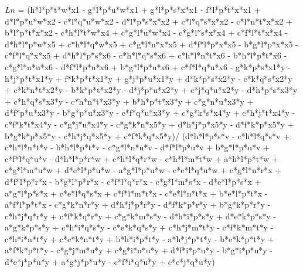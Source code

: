 \documentclass[10pt]{article} %
\begin{document}
$\dot{Ln}$ =
{\tiny
    (h*l*p*t*w*x1 - g*l*p*u*w*x1 + g*l*p*s*x*x1 - f*l*p*t*x*x1 +
     d*l*p*u*w*x2 - c*l*q*u*w*x2 - d*l*p*s*x*x2 + c*l*q*s*x*x2 -
     c*l*n*t*x*x2 + b*l*p*t*x*x2 - c*h*l*t*w*x4 + c*g*l*u*w*x4 -
     c*g*l*s*x*x4 + c*f*l*t*x*x4 - d*h*l*p*w*x5 + c*h*l*q*w*x5 +
     c*g*l*n*x*x5 + d*f*l*p*x*x5 - b*g*l*p*x*x5 - c*f*l*q*x*x5 +
     d*h*l*p*s*x6 - c*h*l*q*s*x6 + c*h*l*n*t*x6 - b*h*l*p*t*x6 -
     c*g*l*n*u*x6 - d*f*l*p*u*x6 + b*g*l*p*u*x6 + c*f*l*q*u*x6 -
     g*k*p*s*x1*y - h*j*p*t*x1*y + f*k*p*t*x1*y + g*j*p*u*x1*y +
     d*k*p*s*x2*y - c*k*q*s*x2*y + c*k*n*t*x2*y - b*k*p*t*x2*y -
     d*j*p*u*x2*y + c*j*q*u*x2*y - d*h*p*s*x3*y + c*h*q*s*x3*y -
     c*h*n*t*x3*y + b*h*p*t*x3*y + c*g*n*u*x3*y + d*f*p*u*x3*y -
     b*g*p*u*x3*y - c*f*q*u*x3*y + c*g*k*s*x4*y + c*h*j*t*x4*y -
     c*f*k*t*x4*y - c*g*j*u*x4*y - c*g*k*n*x5*y + d*h*j*p*x5*y -
     d*f*k*p*x5*y + b*g*k*p*x5*y - c*h*j*q*x5*y + c*f*k*q*x5*y)/
     (d*h*l*p*s*v - c*h*l*q*s*v + c*h*l*n*t*v - b*h*l*p*t*v -
     c*g*l*n*u*v - d*f*l*p*u*v + b*g*l*p*u*v + c*f*l*q*u*v -
     d*h*l*p*r*w + c*h*l*q*r*w - c*h*l*m*t*w + a*h*l*p*t*w +
     c*g*l*m*u*w + d*e*l*p*u*w - a*g*l*p*u*w - c*e*l*q*u*w +
     c*g*l*n*r*x + d*f*l*p*r*x - b*g*l*p*r*x - c*f*l*q*r*x -
     c*g*l*m*s*x - d*e*l*p*s*x + a*g*l*p*s*x + c*e*l*q*s*x +
     c*f*l*m*t*x - c*e*l*n*t*x + b*e*l*p*t*x - a*f*l*p*t*x -
     c*g*k*n*r*y + d*h*j*p*r*y - d*f*k*p*r*y + b*g*k*p*r*y -
     c*h*j*q*r*y + c*f*k*q*r*y + c*g*k*m*s*y - d*h*i*p*s*y +
     d*e*k*p*s*y - a*g*k*p*s*y + c*h*i*q*s*y - c*e*k*q*s*y +
     c*h*j*m*t*y - c*f*k*m*t*y - c*h*i*n*t*y + c*e*k*n*t*y +
     b*h*i*p*t*y - a*h*j*p*t*y - b*e*k*p*t*y + a*f*k*p*t*y -
     c*g*j*m*u*y + c*g*i*n*u*y + d*f*i*p*u*y - b*g*i*p*u*y -
     d*e*j*p*u*y + a*g*j*p*u*y - c*f*i*q*u*y + c*e*j*q*u*y)
}\break
\end{document}
